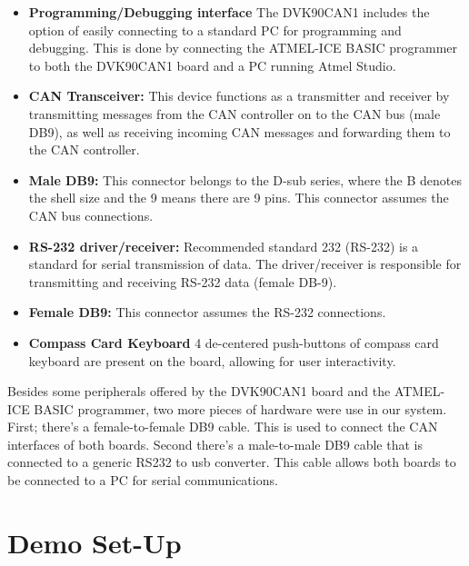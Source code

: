 \begin{itemize}
	\item \textbf{Programming/Debugging interface} The DVK90CAN1 includes the option of easily connecting to a standard PC for programming and debugging. This is done by connecting the ATMEL-ICE BASIC programmer to both the DVK90CAN1 board and a PC running Atmel Studio.
	
	\item \textbf{CAN Transceiver:} This device functions as a transmitter and receiver by transmitting messages from the CAN controller on to the CAN bus (male DB9), as well as receiving incoming CAN messages and forwarding them to the CAN controller. 
	
	\item \textbf{Male DB9:} This connector belongs to the D-sub series, where the B denotes the shell size and the 9 means there are 9 pins. This connector assumes the CAN bus connections.
	
	\item \textbf{RS-232 driver/receiver:} Recommended standard 232 (RS-232) is a standard for serial transmission of data. The driver/receiver is responsible for transmitting and receiving RS-232 data (female DB-9).
	
	\item \textbf{Female DB9:} This connector assumes the RS-232 connections.
	
	\item \textbf{Compass Card Keyboard} 4 de-centered push-buttons of compass card keyboard are present on the board, allowing for user interactivity.
\end{itemize}
Besides some peripherals offered by the DVK90CAN1 board and the ATMEL-ICE BASIC programmer, two more pieces of hardware were use in our system. First; there's a female-to-female DB9 cable. This is used to connect the CAN interfaces of both boards. Second there's a male-to-male DB9 cable that is connected to a generic RS232 to usb converter. This cable allows both boards to be connected to a PC for serial communications.

\section{Demo Set-Up}
\label{sec:demo_setup}

